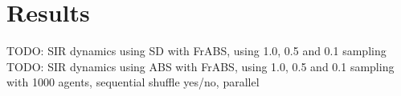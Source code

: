 \section{Results}
TODO: SIR dynamics using SD with FrABS, using 1.0, 0.5 and 0.1 sampling 
TODO: SIR dynamics using ABS with FrABS, using 1.0, 0.5 and 0.1 sampling with 1000 agents, sequential shuffle yes/no, parallel